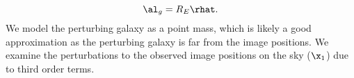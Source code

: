 \begin{equation}
\al_g = R_E \rhat.
\end{equation}
We model the perturbing galaxy as a point mass, which is likely a good approximation as the perturbing galaxy is far from the image positions. We examine the perturbations to the observed image positions on the sky ($\x_1$) due to third order terms.
  
